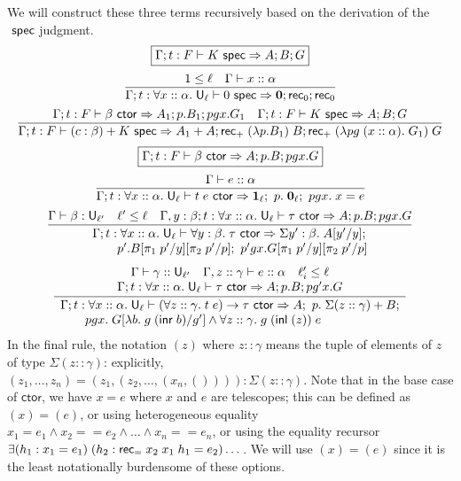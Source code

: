 We will construct these three terms recursively based on the derivation of the $\ \mathsf{spec}$ judgment.
$$\boxed{\Gamma;t:F\vdash K\spec\Rightarrow A;B;G}$$
$$\frac{1\le\ell\quad \Gamma\vdash x::\alpha}{\Gamma;t:\forall x::\alpha.\;\U_\ell\vdash 0\spec\Rightarrow {\bf 0};\rec_0;\rec_0}$$
$$\frac{\Gamma;t:F\vdash \beta\ctor\Rightarrow A_1;p.B_1;pgx.G_1\quad \Gamma;t:F\vdash K\spec\Rightarrow A;B;G}{\Gamma;t:F\vdash (c:\beta)+K\spec\Rightarrow A_1+A;\rec_+\;(\lambda p.B_1)\;B;\rec_+\;(\lambda pg\;(x::\alpha).\;G_1)\;G}$$
$$\boxed{\Gamma;t:F\vdash \beta\ctor\Rightarrow A;p.B;pgx.G}$$
$$\frac{\Gamma\vdash e::\alpha}{\Gamma;t:\forall x::\alpha.\;\U_\ell\vdash t\;e\ctor\Rightarrow {\bf 1}_\ell;\ p.\;{\bf 0}_\ell;\ pgx.\;x=e}$$
$$\frac{\Gamma\vdash \beta:\U_{\ell'}\quad \ell'\le\ell\quad \Gamma,y:\beta;t:\forall x::\alpha.\;\U_\ell\vdash\tau\ctor\Rightarrow A;p.B;pgx.G}{
\begin{array}{l}
\Gamma;t:\forall x::\alpha.\;\U_\ell\vdash\forall y:\beta.\;\tau\ctor\Rightarrow\Sigma y':\beta.\;A[y'/y];\\
\qquad p'.B[\pi_1\;p'/y][\pi_2\;p'/p];\ p'gx.G[\pi_1\;p'/y][\pi_2\;p'/p]
\end{array}}$$
$$\frac{\begin{matrix}
\Gamma\vdash \gamma::\U_{\ell'}\quad \Gamma,z::\gamma\vdash e::\alpha\quad \ell'_i\le\ell\\
\Gamma;t:\forall x::\alpha.\;\U_\ell\vdash\tau\ctor\Rightarrow A;p.B;pg'x.G
\end{matrix}}{
\begin{array}{l}
\Gamma;t:\forall x::\alpha.\;\U_\ell\vdash(\forall z::\gamma.\;t\;e)\to\tau\ctor\Rightarrow A;\ p.\;\Sigma(z::\gamma)+B;\\
\qquad pgx.\;G[\lambda b.\;g\;(\inr b)/g']\land \forall z::\gamma.\;g\;(\inl (z))\;e
\end{array}}$$
In the final rule, the notation $(z)$ where $z::\gamma$ means the tuple of elements of $z$ of type $\Sigma(z::\gamma)$: explicitly, $(z_1,\dots,z_n)=(z_1,(z_2,\dots,(x_n,()))):\Sigma(z::\gamma)$.
Note that in the base case of $\mathsf{ctor}$, we have $x=e$ where $x$ and $e$ are telescopes; this can be defined as $(x)=(e)$, or using heterogeneous equality $x_1=e_1\land x_2==e_2\land \dots\land x_n==e_n$, or using the equality recursor $\exists (h_1:x_1=e_1)\;(h_2:\mathsf{rec}_=\;x_2\;x_1\;h_1=e_2)\dots$. We will use $(x)=(e)$ since it is the least notationally burdensome of these options.

